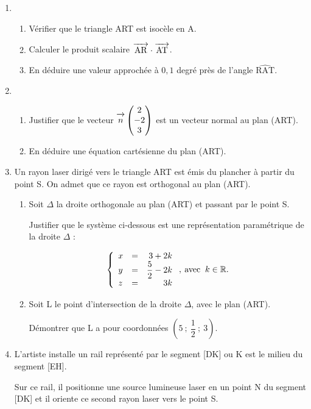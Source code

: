 \documentclass[10pt]{article}
\newcommand{\R}{\mathbb{R}}
\newcommand{\vect}[1]{\overrightarrow{\,\mathstrut#1\,}}
\begin{document}
\begin{enumerate}
\item 
	\begin{enumerate}
		\item Vérifier que le triangle ART est isocèle en A.
		\item Calculer le produit scalaire $\vect{\text{AR}} \cdot \vect{\text{AT}}$.
		\item En déduire une valeur approchée à $0,1$ degré près de l'angle $\widehat{\text{RAT}}$.
	\end{enumerate}
\item 
	\begin{enumerate}
		\item Justifier que le vecteur $\vect{n}\begin{pmatrix}2\\-2\\3\end{pmatrix}$ est un vecteur normal au plan (ART).
		\item En déduire une équation cartésienne du plan (ART).
	\end{enumerate}
\item Un rayon laser dirigé vers le triangle ART est émis du plancher à partir du point S. On admet que ce rayon est orthogonal au plan (ART).
	\begin{enumerate}
		\item Soit $\Delta$ la droite orthogonale au plan (ART) et passant par le point S.
		
Justifier que le système ci-dessous est une représentation paramétrique de la droite $\Delta$ :

\[\left\{\begin{array}{l c r}
x&=&3+2k\\
y&=& \dfrac52 - 2k\\
z &=& 3k
\end{array}\right.,\: \text{avec }\:k \in \R.\]

		\item Soit L le point d'intersection de la droite $\Delta$, avec le plan (ART).

Démontrer que L a pour coordonnées $\left(5~;~\dfrac12~;~3\right)$.
	\end{enumerate}
\item L'artiste installe un rail représenté  par le segment  [DK] ou K est le milieu du segment [EH].

Sur ce rail, il positionne une source lumineuse laser en un point N du segment [DK] et il oriente ce
second rayon laser vers le point S.


\end{enumerate}
\end{document}
